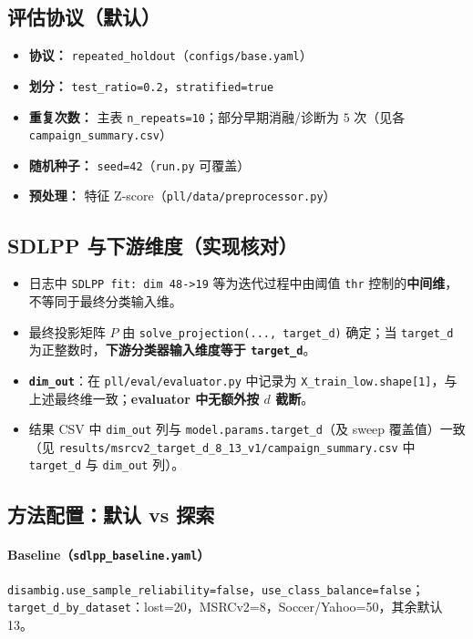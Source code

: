 \documentclass[11pt,a4paper]{article}
\begin{document}
\subsection{评估协议（默认）}
\begin{itemize}
  \item \textbf{协议：} \texttt{repeated\_holdout}（\texttt{configs/base.yaml}）
  \item \textbf{划分：} \texttt{test\_ratio=0.2}，\texttt{stratified=true}
  \item \textbf{重复次数：} 主表 \texttt{n\_repeats=10}；部分早期消融/诊断为 $5$ 次（见各 \texttt{campaign\_summary.csv}）
  \item \textbf{随机种子：} \texttt{seed=42}（\texttt{run.py} 可覆盖）
  \item \textbf{预处理：} 特征 Z-score（\texttt{pll/data/preprocessor.py}）
\end{itemize}

\subsection{SDLPP 与下游维度（实现核对）}
\begin{itemize}
  \item 日志中 \texttt{SDLPP fit: dim 48->19} 等为迭代过程中由阈值 \texttt{thr} 控制的\textbf{中间维}，不等同于最终分类输入维。
  \item 最终投影矩阵 $P$ 由 \texttt{solve\_projection(..., target\_d)} 确定；当 \texttt{target\_d} 为正整数时，\textbf{下游分类器输入维度等于 \texttt{target\_d}}。
  \item \textbf{\texttt{dim\_out}}：在 \texttt{pll/eval/evaluator.py} 中记录为 \texttt{X\_train\_low.shape[1]}，与上述最终维一致；\textbf{evaluator 中无额外按 $d$ 截断}。
  \item 结果 CSV 中 \texttt{dim\_out} 列与 \texttt{model.params.target\_d}（及 sweep 覆盖值）一致（见 \texttt{results/msrcv2\_target\_d\_8\_13\_v1/campaign\_summary.csv} 中 \texttt{target\_d} 与 \texttt{dim\_out} 列）。
\end{itemize}

\subsection{方法配置：默认 vs 探索}

\paragraph{Baseline（\texttt{sdlpp\_baseline.yaml}）}
\texttt{disambig.use\_sample\_reliability=false}，\texttt{use\_class\_balance=false}；
\texttt{target\_d\_by\_dataset}：lost=20，MSRCv2=8，Soccer/Yahoo=50，其余默认 13。
\end{document}
